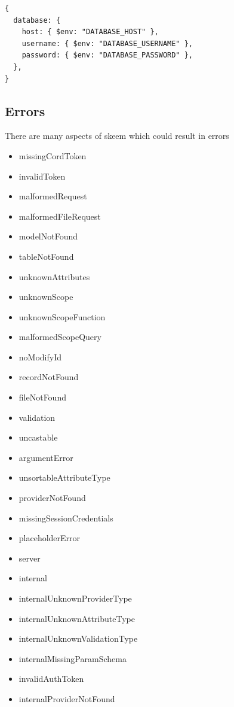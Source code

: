 \documentclass[
  12pt,
]{article}
\begin{document}
\begin{lstlisting}[caption={Configuration which uses enviroment variables to avoid exposing critical infomation}]
{
  database: {
    host: { $env: "DATABASE_HOST" },
    username: { $env: "DATABASE_USERNAME" },
    password: { $env: "DATABASE_PASSWORD" },
  },
}
\end{lstlisting}

\hypertarget{errors}{%
\subsection{Errors}\label{errors}}

There are many aspects of skeem which could result in errors

\begin{multicols}{2}
\begin{itemize}
\item missingCordToken
\item invalidToken
\item malformedRequest
\item malformedFileRequest
\item modelNotFound
\item tableNotFound
\item unknownAttributes
\item unknownScope
\item unknownScopeFunction
\item malformedScopeQuery
\item noModifyId
\item recordNotFound
\item fileNotFound
\item validation
\item uncastable
\item argumentError
\item unsortableAttributeType
\item providerNotFound
\item missingSessionCredentials
\item placeholderError
\item server
\item internal
\item internalUnknownProviderType
\item internalUnknownAttributeType
\item internalUnknownValidationType
\item internalMissingParamSchema
\item invalidAuthToken
\item internalProviderNotFound

\end{itemize}
\end{multicols}
\end{document}
